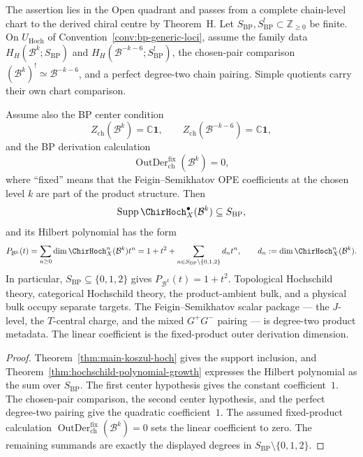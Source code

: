 \begin{proposition}
\label{prop:bp-curve-level-chirhoch}
The assertion lies in the Open quadrant and passes from a complete
chain-level chart to the derived chiral centre by Theorem~H.  Let
$S_{\mathrm{BP}},S_{\mathrm{BP}}^!\subset\mathbb Z_{\geq0}$ be
finite.  On $U_{\mathrm{Hoch}}$ of
Convention~\ref{conv:bp-generic-loci}, assume the family data
$H_H(\mathcal B^k;S_{\mathrm{BP}})$ and
$H_H(\mathcal B^{-k-6};S_{\mathrm{BP}}^!)$, the chosen-pair comparison
$(\mathcal B^k)^!\simeq\mathcal B^{-k-6}$, and a perfect degree-two
chain pairing.  Simple quotients carry their own chart comparison.

Assume also the BP center condition
\[
Z_{\mathrm{ch}}(\mathcal{B}^k)=\mathbb{C}\mathbf{1},
\qquad
Z_{\mathrm{ch}}(\mathcal{B}^{-k-6})=\mathbb{C}\mathbf{1},
\]
and the BP derivation calculation
\[
\operatorname{OutDer}^{\mathrm{fix}}_{\mathrm{ch}}(\mathcal{B}^k)=0,
\]
where ``fixed'' means that the Feigin--Semikhatov OPE coefficients at
the chosen level $k$ are part of the product structure.  Then
\[
 \operatorname{Supp}\ChirHoch_X^\bullet(\mathcal B^k)
 \subseteq S_{\mathrm{BP}},
\]
and its Hilbert polynomial has the form
\[
P_{\mathcal{B}^k}(t)
=\sum_{n\ge0}\dim\ChirHoch_X^n(\mathcal{B}^k)t^n
=1+t^2+
 \sum_{n\in S_{\mathrm{BP}}\setminus\{0,1,2\}}
 d_nt^n,
\qquad
d_n:=\dim\ChirHoch_X^n(\mathcal B^k).
\]
In particular, $S_{\mathrm{BP}}\subseteq\{0,1,2\}$ gives
$P_{\mathcal B^k}(t)=1+t^2$.
Topological Hochschild theory, categorical Hochschild theory, the
product-ambient bulk, and a physical bulk occupy separate targets.
The Feigin--Semikhatov scalar package --- the $J$-level, the
$T$-central charge, and the mixed $G^+G^-$ pairing --- is degree-two
product metadata.  The linear coefficient is the fixed-product outer
derivation dimension.
\end{proposition}

\begin{proof}
Theorem~\ref{thm:main-koszul-hoch} gives the support inclusion, and
Theorem~\ref{thm:hochschild-polynomial-growth} expresses the Hilbert
polynomial as the sum over $S_{\mathrm{BP}}$.  The first center
hypothesis gives the constant coefficient~$1$.  The chosen-pair
comparison, the second center hypothesis, and the perfect degree-two
pairing give the quadratic coefficient~$1$.
The assumed fixed-product calculation
$\operatorname{OutDer}^{\mathrm{fix}}_{\mathrm{ch}}(\mathcal B^k)=0$
sets the linear coefficient to zero.  The remaining summands are
exactly the displayed degrees in
$S_{\mathrm{BP}}\setminus\{0,1,2\}$.
\end{proof}


